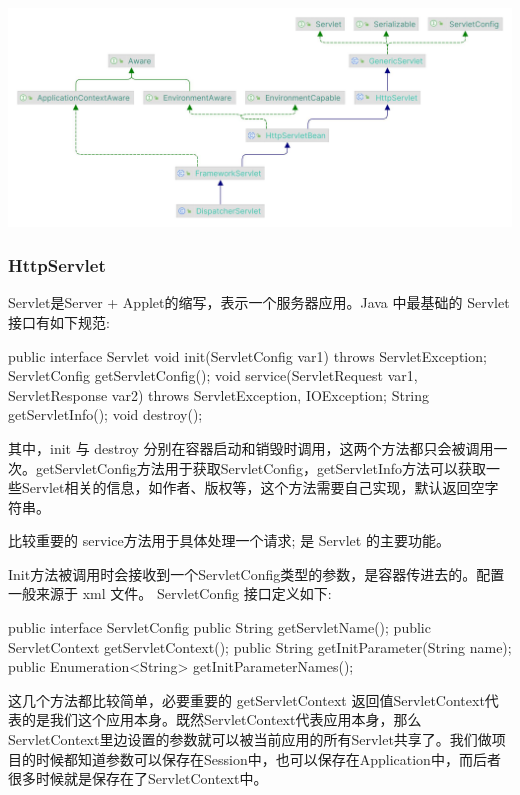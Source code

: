 \includegraphics[width=0.9\linewidth]{../../../imgs/uml/DispatcherServlet.jpg}

\subsubsection{HttpServlet}

Servlet是Server + Applet的缩写，表示一个服务器应用。Java 中最基础的 Servlet 接口有如下规范:

\begin{Java}
public interface Servlet {
    void init(ServletConfig var1) throws ServletException;
    ServletConfig getServletConfig();
    void service(ServletRequest var1, ServletResponse var2) throws ServletException, IOException;
    String getServletInfo();
    void destroy();
}
\end{Java}

其中，init 与 destroy 分别在容器启动和销毁时调用，这两个方法都只会被调用一次。getServletConfig方法用于获取ServletConfig，getServletInfo方法可以获取一些Servlet相关的信息，如作者、版权等，这个方法需要自己实现，默认返回空字符串。

比较重要的 service方法用于具体处理一个请求; 是 Servlet 的主要功能。

Init方法被调用时会接收到一个ServletConfig类型的参数，是容器传进去的。配置一般来源于 xml 文件。 ServletConfig 接口定义如下:

\begin{Java}
public interface ServletConfig {
    public String getServletName();
    public ServletContext getServletContext();
    public String getInitParameter(String name);
    public Enumeration<String> getInitParameterNames();
}
\end{Java}

这几个方法都比较简单，必要重要的 getServletContext 返回值ServletContext代表的是我们这个应用本身。既然ServletContext代表应用本身，那么ServletContext里边设置的参数就可以被当前应用的所有Servlet共享了。我们做项目的时候都知道参数可以保存在Session中，也可以保存在Application中，而后者很多时候就是保存在了ServletContext中。

